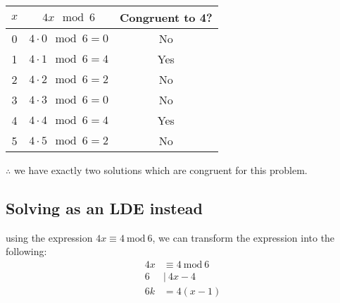 \documentclass[11pt]{article}
\begin{document}
\begin{center}
\begin{tabular}{|c|c|c|}
\hline
\( x \) & \( 4x \mod 6 \) & Congruent to 4? \\
\hline
0 & \( 4 \cdot 0 \mod 6 = 0 \) & No \\
1 & \( 4 \cdot 1 \mod 6 = 4 \) & Yes \\
2 & \( 4 \cdot 2 \mod 6 = 2 \) & No \\
3 & \( 4 \cdot 3 \mod 6 = 0 \) & No \\
4 & \( 4 \cdot 4 \mod 6 = 4 \) & Yes \\
5 & \( 4 \cdot 5 \mod 6 = 2 \) & No \\
\hline
\end{tabular}
\end{center}
\(\therefore\) we have exactly two solutions which are congruent for this problem.

\subsection{Solving as an LDE instead}
\label{sec:org7702bd0}
using the expression \(4x \equiv 4\ \text{mod}\ 6\), we can transform the expression into the following:
\begin{align*}
4x &\equiv 4\ \text{mod}\ 6\\
6 &|\ 4x - 4\\
6k &= 4(x - 1)
\end{align*}
\end{document}
